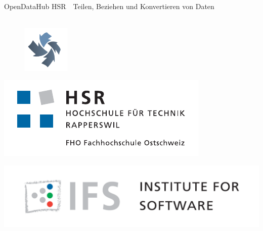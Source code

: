 
\author{
	\rlif \\
	\and
	\chuf \\
	\and
	\fscf \\
}

\clearpage
\begin{titlepage}
	
	\begin{center}
		 \\
		 \\ [25pt]
		\hr{1pt} \\[0.2cm]
		\huge OpenDataHub HSR\ \textendash \ Teilen, Beziehen und Konvertieren von Daten \\
		\hr{1pt} \\[0.2cm]
		
		\begin{figure}[H]
			\centering
			\includegraphics[width=0.2\textwidth]{fig/opendatahub-logo}
		\end{figure}
		
		\begin{minipage}{0.4\textwidth}
			\includegraphics[width=\textwidth]{fig/hsr-logo}
		\end{minipage}
		\begin{minipage}{0.4\textwidth}
			\includegraphics[width=\textwidth]{fig/ifs-logo}
		\end{minipage}
		

\end{center}
\end{titlepage}
